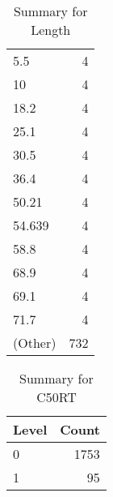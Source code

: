 \begin{table}[ht]
\begin{tabular}{lr}
  5.5 &   4 \\ 
  10 &   4 \\ 
  18.2 &   4 \\ 
  25.1 &   4 \\ 
  30.5 &   4 \\ 
  36.4 &   4 \\ 
  50.21 &   4 \\ 
  54.639 &   4 \\ 
  58.8 &   4 \\ 
  68.9 &   4 \\ 
  69.1 &   4 \\ 
  71.7 &   4 \\ 
  (Other) & 732 \\ 
   \hline
\end{tabular}
\caption{Summary for Length} 
\label{tab: Length}
\end{table}
\begin{table}[ht]
\centering
\begin{tabular}{lr}
  \hline
Level & Count \\ 
  \hline
0 & 1753 \\ 
  1 &  95 \\ 
   \hline
\end{tabular}
\caption{Summary for C50RT} 
\label{tab: C50RT}
\end{table}
